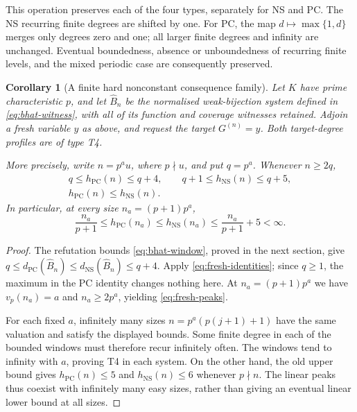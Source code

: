 \documentclass[11pt,a4paper]{article}
\newtheorem{corollary}[theorem]{Corollary}
\theoremstyle{definition}\newtheorem{definition}[theorem]{Definition}
\theoremstyle{remark}\newtheorem{remark}[theorem]{Remark}
\newcommand{\NS}{\mathrm{NS}}\newcommand{\PC}{\mathrm{PC}}
\begin{document}
This operation preserves each of the four types, separately for NS
and PC. The NS recurring finite degrees are shifted by one. For PC,
the map $d\mapsto\max\{1,d\}$ merges only degrees zero and one;
all larger finite degrees and infinity are unchanged. Eventual
boundedness, absence or unboundedness of recurring finite levels, and
the mixed periodic case are consequently preserved.

\begin{corollary}[A finite hard nonconstant consequence family]\label{cor:fresh-peaks}
Let $K$ have prime characteristic $p$, and let $\widehat B_n$ be the
normalised weak-bijection system defined in
\eqref{eq:bhat-witness}, with all of its function and coverage witnesses
retained. Adjoin a fresh variable $y$ as above, and request the target
$G^{(n)}=y$. Both target-degree profiles are of type T4.

More precisely, write $n=p^a u$, where $p\nmid u$, and put $q=p^a$.
Whenever $n\ge2q$,
\[
 \begin{gathered}
 q\le h_{\PC}(n)\le q+4,\qquad
 q+1\le h_{\NS}(n)\le q+5,\\
                         h_{\PC}(n)\le h_{\NS}(n).
 \end{gathered}
\]
In particular, at every size $n_a=(p+1)p^a$,
\begin{equation}\label{eq:fresh-peaks}
 \frac{n_a}{p+1}\le h_{\PC}(n_a)\le h_{\NS}(n_a)
                              \le\frac{n_a}{p+1}+5<\infty.
\end{equation}
\end{corollary}
\begin{proof}
The refutation bounds \eqref{eq:bhat-window}, proved in the next
section, give
$q\le d_{\PC}(\widehat B_n)\le d_{\NS}(\widehat B_n)\le q+4$.
Apply \eqref{eq:fresh-identities}; since $q\ge1$, the maximum in the
PC identity changes nothing here. At $n_a=(p+1)p^a$ we have
$v_p(n_a)=a$ and $n_a\ge2p^a$, yielding \eqref{eq:fresh-peaks}.

For each fixed $a$, infinitely many sizes
$n=p^a(p(j+1)+1)$ have the same valuation and satisfy the displayed
bounds. Some finite degree in each of the bounded windows must
therefore recur infinitely often. The windows tend to infinity with
$a$, proving T4 in each system. On the other hand, the old upper
bound gives $h_{\PC}(n)\le5$ and $h_{\NS}(n)\le6$ whenever
$p\nmid n$. The linear peaks thus coexist with infinitely many easy
sizes, rather than giving an eventual linear lower bound at all sizes.
\end{proof}
\end{document}
